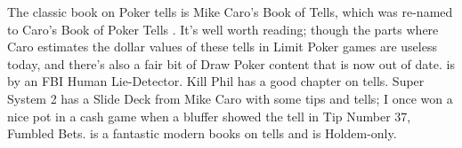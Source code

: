 
The classic book on Poker tells is Mike Caro's Book of Tells, which
was re-named to Caro's Book of Poker Tells \citep{CaroTells}. It's well
worth reading; though the parts where Caro estimates the dollar values
of these tells in Limit Poker games are useless today, and there's
also a fair bit of Draw Poker content that is now out of date.
\citep{Navarro} is by an FBI Human Lie-Detector. Kill Phil has a
good chapter on tells. Super System 2 has a Slide Deck from Mike Caro
with some tips and  tells; I once won a nice pot in a cash game when
a bluffer showed the tell in Tip Number 37, Fumbled Bets.
\citep{Elwood} is a fantastic modern books on tells and is Holdem-only.
